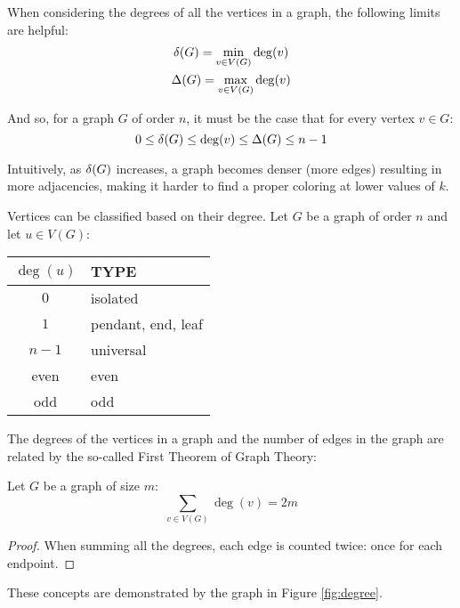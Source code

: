 When considering the degrees of all the vertices in a graph, the following limits are helpful:
\begin{gather*}
  \delta(G)=\min_{v\in V(G)}\deg(v) \\
  \Delta(G)=\max_{v\in V(G)}\deg(v)
\end{gather*}

And so, for a graph \(G\) of order \(n\), it must be the case that for every vertex \(v\in G\):
\[0\le\delta(G)\le\deg(v)\le\Delta(G)\le n-1\]

Intuitively, as \(\delta(G)\) increases, a graph becomes denser (more edges) resulting in more adjacencies, making it
harder to find a proper coloring at lower values of \(k\).

Vertices can be classified based on their degree.  Let \(G\) be a graph of order \(n\) and let \(u\in V(G)\):

\begin{center}
  \begin{tabular}{|c|l|}
    \hline
    \(\deg(u)\) & TYPE \\
    \hline
    \(0\) & isolated \\
    \(1\) & pendant, end, leaf \\
    \(n-1\) & universal \\
    even & even \\
    odd & odd \\
    \hline
  \end{tabular}
\end{center}

The degrees of the vertices in a graph and the number of edges in the graph are related by the so-called First
Theorem of Graph Theory:

\begin{theorem}
  \label{thm:first}
  Let \(G\) be a graph of size \(m\):
  \[\sum_{v\in V(G)}\deg(v)=2m\]
\end{theorem}

\begin{proof}
  When summing all the degrees, each edge is counted twice: once for each endpoint.
\end{proof}

These concepts are demonstrated by the graph in Figure \ref{fig:degree}.

